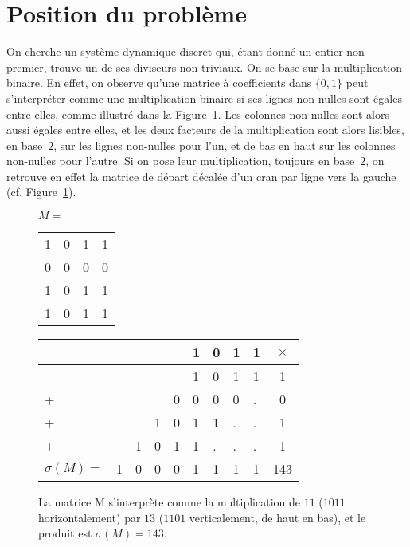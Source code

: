 \section{Position du problème}
\label{sec:introfacto}



On cherche un système dynamique discret qui, étant donné un entier non-premier, trouve un de ses diviseurs non-triviaux. On se base sur la multiplication binaire. En effet, on observe qu'une matrice à coefficients dans $\{0,1\}$ peut s'interpréter comme une multiplication binaire si ses lignes non-nulles sont égales entre elles, comme illustré dans la Figure~\ref{fig:ExShift}. Les colonnes non-nulles sont alors aussi égales entre elles, et les deux facteurs de la multiplication sont alors lisibles, en base~$2$, sur les lignes non-nulles pour l'un, et de bas en haut sur les colonnes non-nulles pour l'autre. Si on pose leur multiplication, toujours en base~$2$, on retrouve en effet la matrice de départ décalée d'un cran par ligne vers la gauche (cf. Figure~\ref{fig:ExShift}).




\begin{figure}[h]
\centering
\begin{minipage}[]{0.25\linewidth}
$M=$
\begin{tabular}{cccc}
1&0&1&1\\
0&0&0&0\\
1&0&1&1\\
1&0&1&1\\
\end{tabular}

\end{minipage}
\quad
\begin{minipage}[]{0.4\linewidth}


\begin{tabular}{lllllllll|c}
&&&&&1&0&1&1&$\times$\\
\hline
&&&&&1&0&1&1&1\\
+&&&&0&0&0&0&.&0 \\
+&&&1&0&1&1&.&.&1\\
+&&1&0&1&1&.&.&.&1\\
\hline
$\sigma(M)=$&1&0&0&0&1&1&1&1&143\\
\end{tabular}
\end{minipage}
\caption{La matrice M s'interprète comme la multiplication de $11$ ($1011$ horizontalement) par $13$ ($1101$ verticalement, de haut en bas), et le produit est $\sigma(M)=143$.}
\label{fig:ExShift}
\end{figure}

